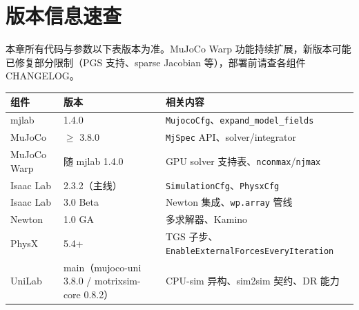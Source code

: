 \section*{版本信息速查}
\label{sec:rlmc-phys-versions}

本章所有代码与参数以下表版本为准。MuJoCo Warp 功能持续扩展，新版本可能已修复部分限制（PGS 支持、sparse Jacobian 等），部署前请查各组件 CHANGELOG。

\begin{center}
\small
\begin{tabular}{@{}lll@{}}
\toprule
组件 & 版本 & 相关内容 \\
\midrule
mjlab & 1.4.0 & \verb|MujocoCfg|、\verb|expand_model_fields| \\
MuJoCo & $\ge$ 3.8.0 & \verb|MjSpec| API、solver/integrator \\
MuJoCo Warp & 随 mjlab 1.4.0 & GPU solver 支持表、\verb|nconmax|/\verb|njmax| \\
Isaac Lab & 2.3.2（主线） & \verb|SimulationCfg|、\verb|PhysxCfg| \\
Isaac Lab & 3.0 Beta & Newton 集成、\verb|wp.array| 管线 \\
Newton & 1.0 GA & 多求解器、Kamino \\
PhysX & 5.4+ & TGS 子步、\verb|EnableExternalForcesEveryIteration| \\
UniLab & main（mujoco-uni 3.8.0 / motrixsim-core 0.8.2） & CPU-sim 异构、sim2sim 契约、DR 能力 \\
\bottomrule
\end{tabular}
\end{center}
